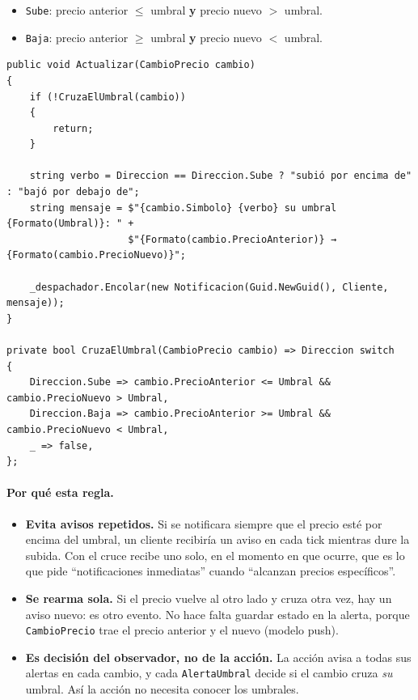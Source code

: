 \begin{itemize}
  \item \texttt{Sube}: precio anterior $\le$ umbral \textbf{y} precio nuevo $>$ umbral.
  \item \texttt{Baja}: precio anterior $\ge$ umbral \textbf{y} precio nuevo $<$ umbral.
\end{itemize}

\begin{lstlisting}[basicstyle=\ttfamily\footnotesize, columns=fullflexible, keepspaces=true, caption={\texttt{AlertaUmbral}: el observador decide si el cambio cruza su umbral.}]
public void Actualizar(CambioPrecio cambio)
{
    if (!CruzaElUmbral(cambio))
    {
        return;
    }

    string verbo = Direccion == Direccion.Sube ? "subió por encima de" : "bajó por debajo de";
    string mensaje = $"{cambio.Simbolo} {verbo} su umbral {Formato(Umbral)}: " +
                     $"{Formato(cambio.PrecioAnterior)} → {Formato(cambio.PrecioNuevo)}";

    _despachador.Encolar(new Notificacion(Guid.NewGuid(), Cliente, mensaje));
}

private bool CruzaElUmbral(CambioPrecio cambio) => Direccion switch
{
    Direccion.Sube => cambio.PrecioAnterior <= Umbral && cambio.PrecioNuevo > Umbral,
    Direccion.Baja => cambio.PrecioAnterior >= Umbral && cambio.PrecioNuevo < Umbral,
    _ => false,
};
\end{lstlisting}

\paragraph{Por qué esta regla.}
\begin{itemize}
  \item \textbf{Evita avisos repetidos.} Si se notificara siempre que el precio esté por
        encima del umbral, un cliente recibiría un aviso en cada tick mientras dure la
        subida. Con el cruce recibe uno solo, en el momento en que ocurre, que es lo que pide
        ``notificaciones inmediatas'' cuando ``alcanzan precios específicos''.
  \item \textbf{Se rearma sola.} Si el precio vuelve al otro lado y cruza otra vez, hay un
        aviso nuevo: es otro evento. No hace falta guardar estado en la alerta, porque
        \texttt{CambioPrecio} trae el precio anterior y el nuevo (modelo push).
  \item \textbf{Es decisión del observador, no de la acción.} La acción avisa a todas sus
        alertas en cada cambio, y cada \texttt{AlertaUmbral} decide si el cambio cruza
        \emph{su} umbral. Así la acción no necesita conocer los umbrales.
\end{itemize}

